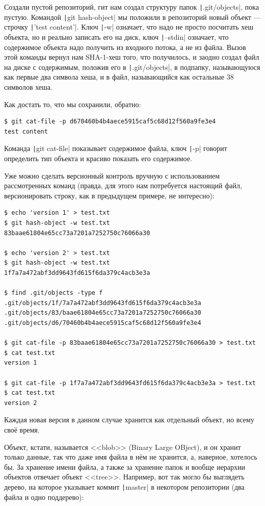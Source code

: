 \documentclass[a5paper]{article}
\begin{document}
Создали пустой репозиторий, гит нам создал структуру папок \texttt|.git/objects|, пока пустую. Командой \texttt|git hash-object| мы положили в репозиторий новый объект --- строчку \texttt|'test content'|. Ключ \texttt|-w| означает, что надо не просто посчитать хеш объекта, но и реально записать его на диск, ключ \texttt|--stdin| означает, что содержимое объекта надо получить из входного потока, а не из файла. Вызов этой команды вернул нам SHA-1-хеш того, что получилось, и заодно создал файл на диске с содержимым, положив его в \texttt|.git/objects|, в подпапку, называющуюся как первые два символа хеша, и в файл, называющийся как остальные 38 символов хеша.

Как достать то, что мы сохранили, обратно:
\begin{verbatim}
$ git cat-file -p d670460b4b4aece5915caf5c68d12f560a9fe3e4
test content
\end{verbatim}

Команда \texttt|git cat-file| показывает содержимое файла, ключ \texttt|-p| говорит определить тип объекта и красиво показать его содержимое.

Уже можно сделать версионный контроль вручную с использованием рассмотренных команд (правда, для этого нам потребуется настоящий файл, версионировать строку, как в предыдущем примере, не интересно):

\begin{verbatim}
$ echo 'version 1' > test.txt
$ git hash-object -w test.txt
83baae61804e65cc73a7201a7252750c76066a30

$ echo 'version 2' > test.txt
$ git hash-object -w test.txt
1f7a7a472abf3dd9643fd615f6da379c4acb3e3a

$ find .git/objects -type f
.git/objects/1f/7a7a472abf3dd9643fd615f6da379c4acb3e3a
.git/objects/83/baae61804e65cc73a7201a7252750c76066a30
.git/objects/d6/70460b4b4aece5915caf5c68d12f560a9fe3e4

$ git cat-file -p 83baae61804e65cc73a7201a7252750c76066a30 > test.txt
$ cat test.txt
version 1

$ git cat-file -p 1f7a7a472abf3dd9643fd615f6da379c4acb3e3a > test.txt
$ cat test.txt
version 2
\end{verbatim}

Каждая новая версия в данном случае хранится как отдельный объект, но всему своё время.

Объект, кстати, называется <<blob>> (Binary Large OBject), и он хранит только данные, так что даже имя файла в нём не хранится, а, наверное, хотелось бы. За хранение имени файла, а также за хранение папок и вообще иерархии объектов отвечает объект <<tree>>. Например, вот так могло бы выглядеть дерево, на которое указывает коммит \texttt|master| в некотором репозитории (два файла и одно поддерево):
\end{document}
